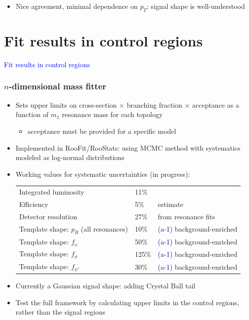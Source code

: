 \documentclass[compress]{beamer}
\begin{document}
\begin{frame}
\begin{itemize}
\item Nice agreement, minimal dependence on $p_T$: signal shape is well-understood
\end{itemize}
\end{frame}

\section*{Fit results in control regions}
\begin{frame}
\begin{center}
\Huge \textcolor{blue}{Fit results in control regions}
\end{center}
\end{frame}

\begin{frame}
\frametitle{$n$-dimensional mass fitter}
\begin{itemize}
\item Sets upper limits on cross-section $\times$ branching fraction
  $\times$ acceptance as a function of $m_1$ resonance mass for each
  topology
\begin{itemize}
\item acceptance must be provided for a specific model
\end{itemize}

\item Implemented in RooFit/RooStats: using MCMC method with
  systematics modeled as log-normal distributions
\item Working values for systematic uncertainties (in progress):

{\scriptsize
\begin{tabular}{l l l}
Integrated luminosity & 11\% & \\
Efficiency & 5\% & estimate \\
Detector resolution & 27\% & from resonance fits \\
Template shape: $p_R$ (all resonances) & 10\% & \textcolor{darkblue}{(a-1)} background-enriched \\
Template shape: $f_\omega$ & 50\% & \textcolor{darkblue}{(a-1)} background-enriched \\
Template shape: $f_\phi$ & 125\% & \textcolor{darkblue}{(a-1)} background-enriched \\
Template shape: $f_{\psi'}$ & 30\% & \textcolor{darkblue}{(a-1)} background-enriched \\
\end{tabular}}

\item Currently a Gaussian signal shape: adding Crystal Ball tail

\item Test the full framework by calculating upper limits in the
  control regions, rather than the signal regions
\end{itemize}
\end{frame}
\end{document}
